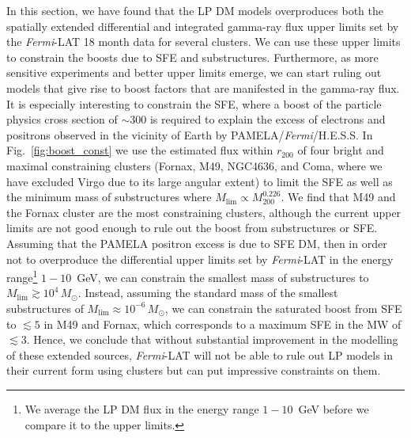 \documentclass[10pt,aps,pra,reprint,amsmath,amsfonts,amssymb,showpacs,nofootinbib,floatfix]{revtex4-1}
\newcommand{\Fermi}{{\em Fermi}\xspace}
\newcommand{\rmn}{\mathrm}
\newcommand{\msun}{M_\odot}
\newcommand{\rvir}{r_{200}}
\newcommand{\mvir}{M_{200}}
\begin{document}
In this section, we have found that the LP DM models overproduces both
the spatially extended differential and integrated gamma-ray flux
upper limits set by the \Fermi-LAT 18 month data for several
clusters. We can use these upper limits to constrain the boosts due to
SFE and substructures. Furthermore, as more sensitive experiments and
better upper limits emerge, we can start ruling out models that give
rise to boost factors that are manifested in the gamma-ray flux. It is
especially interesting to constrain the SFE, where a boost of the
particle physics cross section of $\sim$300 is required to explain the
excess of electrons and positrons observed in the vicinity of Earth by
PAMELA/\Fermi/H.E.S.S. In Fig.~\ref{fig:boost_const} we use the
estimated flux within $\rvir$ of four bright and maximal constraining
clusters (Fornax, M49, NGC4636, and Coma, where we have excluded Virgo
due to its large angular extent) to limit the SFE as well as the
minimum mass of substructures where
$M_\rmn{lim}\propto\mvir^{0.226}$. We find that M49 and the Fornax
cluster are the most constraining clusters, although the current upper
limits are not good enough to rule out the boost from substructures or
SFE. Assuming that the PAMELA positron excess is due to SFE DM, then
in order not to overproduce the differential upper limits set by
\Fermi-LAT in the energy range\footnote{We average the LP DM flux in
  the energy range $1-10$~GeV before we compare it to the upper
  limits.} $1-10$~GeV, we can constrain the smallest mass of
substructures to $M_\rmn{lim}\gtrsim 10^4\,\msun$. Instead, assuming
the standard mass of the smallest substructures of $M_\rmn{lim}\approx
10^{-6}\,\msun$, we can constrain the saturated boost from SFE to
$\lesssim 5$ in M49 and Fornax, which corresponds to a maximum SFE in
the MW of $\lesssim3$. Hence, we conclude that without substantial
improvement in the modelling of these extended sources, \Fermi-LAT
will not be able to rule out LP models in their current form using
clusters but can put impressive constraints on them.
\end{document}
